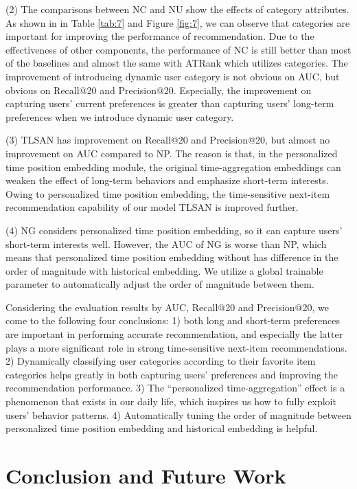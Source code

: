 \documentclass[preprint,12pt]{elsarticle}
\newcommand{\tool}{TLSAN\xspace}
\begin{document}
\begin{sloppypar}
(2) The comparisons between NC and NU show the effects of category attributes. As shown in in Table \ref{tab:7} and Figure \ref{fig:7}, we can observe that categories are important for improving the performance of recommendation. Due to the effectiveness of other components, the performance of NC is still better than most of the baselines and almost the same with ATRank which utilizes categories. The improvement of introducing dynamic user category is not obvious on AUC, but obvious on Recall@20 and Precision@20. Especially, the improvement on capturing users' current preferences is greater than capturing users' long-term preferences when we introduce dynamic user category.

(3) \tool has improvement on Recall@20 and Precision@20, but almost no improvement on AUC compared to NP. The reason is that, in the personalized time position embedding module, the original time-aggregation embeddings can weaken the effect of long-term behaviors and emphasize short-term interests. Owing to personalized time position embedding, the time-sensitive next-item recommendation capability of our model \tool is improved further. 

(4) NG considers personalized time position embedding, so it can capture users' short-term interests well. However, the AUC of NG is worse than NP, which means that personalized time position embedding without  has difference in the order of magnitude with historical embedding. We utilize a global trainable parameter  to automatically adjust the order of magnitude between them.

Considering the evaluation results by AUC, Recall@20 and Precision@20, we come to the following four conclusions: 1) both long and short-term preferences are important in performing accurate recommendation, and especially the latter plays a more significant role in strong time-sensitive next-item recommendations. 2) Dynamically classifying user categories according to their favorite item categories helps greatly in both capturing users' preferences and improving the recommendation performance. 3) The ``personalized time-aggregation'' effect is a phenomenon that exists in our daily life, which inspires us how to fully exploit users' behavior patterns. 4) Automatically tuning the order of magnitude between personalized time position embedding and historical embedding is helpful.

\section{Conclusion and Future Work}
\label{sec_conclusion_future}


\end{sloppypar}
\end{document}
